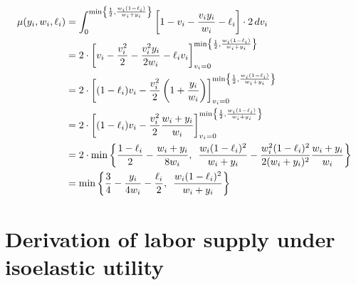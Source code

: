 \documentclass[11pt,letterpaper]{article}                  %
\begin{document}
\begin{align*}
	\mu (y_i, w_i, \ell_i) &= \int_0^{\min \left\lbrace \frac{1}{2}, \frac{w_i (1-\ell_i)}{w_i + y_i} \right\rbrace} \left[ 1 - v_i - \frac{v_i y_i}{w_i} - \ell_i \right] \cdot 2 \, d v_i \\
	&= 2 \cdot \left[ v_i - \frac{v_i^2}{2} - \frac{v_i^2 y_i}{2 w_i} - \ell_i v_i \right]_{v_i = 0}^{\min \left\lbrace \frac{1}{2}, \frac{w_i (1-\ell_i)}{w_i + y_i} \right\rbrace} \\
	&= 2 \cdot \left[ (1-\ell_i) v_i - \frac{v_i^2}{2} \left( 1 + \frac{y_i}{w_i} \right) \right]_{v_i = 0}^{\min \left\lbrace \frac{1}{2}, \frac{w_i (1-\ell_i)}{w_i + y_i} \right\rbrace} \\
	&= 2 \cdot \left[ (1-\ell_i) v_i - \frac{v_i^2}{2} \frac{w_i + y_i}{w_i} \right]_{v_i = 0}^{\min \left\lbrace \frac{1}{2}, \frac{w_i (1-\ell_i)}{w_i + y_i} \right\rbrace} \\
	&= 2 \cdot \min \left\lbrace \frac{1-\ell_i}{2} - \frac{w_i + y_i}{8 w_i} , \enskip \frac{w_i (1-\ell_i)^2}{w_i + y_i} - \frac{w_i^2 (1-\ell_i)^2}{2 (w_i + y_i)^2} \frac{w_i + y_i}{w_i} \right\rbrace \\
	&= \min \left\lbrace \frac{3}{4} - \frac{y_i}{4 w_i} - \frac{\ell_i}{2} , \enskip \frac{w_i (1-\ell_i)^2}{w_i + y_i} \right\rbrace
\end{align*}


\bigskip

\section{Derivation of labor supply under isoelastic utility}
\label{app:iso}
\end{document}
